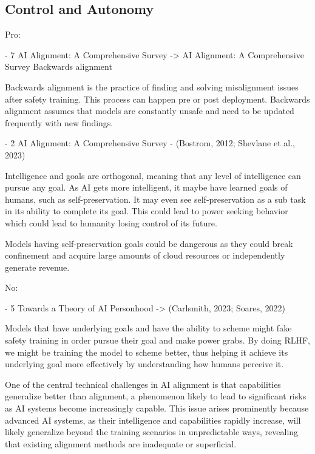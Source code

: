 \subsection{Control and Autonomy}

Pro:

- 7 AI Alignment: A Comprehensive Survey -> AI Alignment: A Comprehensive Survey
Backwards alignment
\citep{ji_ai_2023}

Backwards alignment is the practice of finding and solving misalignment issues after safety training. This process can happen pre or post deployment. Backwards alignment assumes that models are constantly unsafe and need to be updated frequently with new findings.

- 2 AI Alignment: A Comprehensive Survey - (Bostrom, 2012; Shevlane et al., 2023)
\citep{bostrom_superintelligent_2012}

Intelligence and goals are orthogonal, meaning that any level of intelligence can pursue any goal. As AI gets more intelligent, it maybe have learned goals of humans, such as self-preservation. It may even see self-preservation as a sub task in its ability to complete its goal. This could lead to power seeking behavior which could lead to humanity losing control of its future.

\citep{shevlane_model_2023}

Models having self-preservation goals could be dangerous as they could break confinement and acquire large amounts of cloud resources or independently generate revenue.

No:

- 5 Towards a Theory of AI Personhood -> (Carlsmith, 2023; Soares, 2022)
\citep{carlsmith_scheming_2023}

Models that have underlying goals and have the ability to scheme might fake safety training in order pursue their goal and make power grabs. By doing RLHF, we might be training the model to scheme better, thus helping it achieve its underlying goal more effectively by understanding how humans perceive it.

\citep{soares_central_2022}

One of the central technical challenges in AI alignment is that capabilities generalize better than alignment, a phenomenon likely to lead to significant risks as AI systems become increasingly capable. This issue arises prominently because advanced AI systems, as their intelligence and capabilities rapidly increase, will likely generalize beyond the training scenarios in unpredictable ways, revealing that existing alignment methods are inadequate or superficial.

